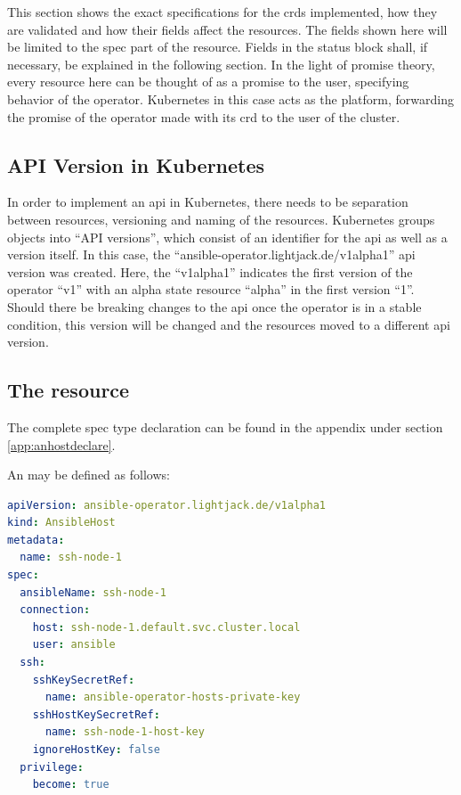 This section shows the exact specifications for the \glspl{crd} implemented, how they are validated and how their fields affect the resources.
The fields shown here will be limited to the spec part of the resource.
Fields in the status block shall, if necessary, be explained in the following section.
In the light of promise theory, every resource here can be thought of as a promise to the user, specifying behavior of the operator.
Kubernetes in this case acts as the platform, forwarding the promise of the operator made with its \gls{crd} to the user of the cluster.

\subsection{API Version in Kubernetes}

In order to implement an \gls{api} in Kubernetes, there needs to be separation between resources, versioning and naming of the resources.
Kubernetes groups objects into \enquote{API versions}, which consist of an identifier for the \gls{api} as well as a version itself.
In this case, the \enquote{ansible-operator.lightjack.de/v1alpha1} \gls{api} version was created.
Here, the \enquote{v1alpha1} indicates the first version of the operator \enquote{v1} with an alpha state resource \enquote{alpha} in the first version \enquote{1}.
Should there be breaking changes to the \gls{api} once the operator is in a stable condition, this version will be changed and the resources moved to a different \gls{api} version.

\clearpage
\subsection{The \anhost resource}
The complete \anhost spec type declaration can be found in the appendix under section \ref{app:anhostdeclare}.

An \anhost may be defined as follows:

\begin{lstlisting}[language=yaml,caption=Example \anhost definition]
apiVersion: ansible-operator.lightjack.de/v1alpha1
kind: AnsibleHost
metadata:
  name: ssh-node-1
spec:
  ansibleName: ssh-node-1
  connection:
    host: ssh-node-1.default.svc.cluster.local
    user: ansible
  ssh:
    sshKeySecretRef:
      name: ansible-operator-hosts-private-key
    sshHostKeySecretRef:
      name: ssh-node-1-host-key
    ignoreHostKey: false
  privilege:
    become: true
\end{lstlisting}

